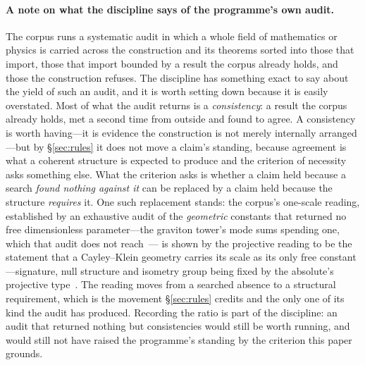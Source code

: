 \documentclass[11pt,a4paper]{article}
\begin{document}
\paragraph{A note on what the discipline says of the programme's own audit.} The corpus runs a
systematic audit in which a whole field of mathematics or physics is carried across
the construction and its theorems sorted into those that import, those that import bounded by a
result the corpus already holds, and those the construction refuses. The discipline has something
exact to say about the yield of such an audit, and it is worth setting down because it is easily
overstated. Most of what the audit returns is a \emph{consistency}: a result the corpus already
holds, met a second time from outside and found to agree. A consistency is worth having---it is
evidence the construction is not merely internally arranged---but by \S\ref{sec:rules} it does not
move a claim's standing, because agreement is what a coherent structure is expected to produce and
the criterion of necessity asks something else. What the criterion asks is whether a claim held
because a search \emph{found nothing against it} can be replaced by a claim held because the
structure \emph{requires} it. One such replacement stands: the corpus's one-scale reading,
established by an exhaustive audit of the \emph{geometric} constants that returned no free dimensionless
parameter---the graviton tower's mode sums spending one, which that audit does not
reach~\cite{JanzenCanonicalTime}---
is shown by the projective reading to be the statement that a Cayley--Klein geometry carries its
scale as its only free constant---signature, null structure and isometry group being fixed by the
absolute's projective type~\cite{JanzenGeometricCore}. The reading moves from a searched absence to
a structural requirement, which is the movement \S\ref{sec:rules} credits and the only one of its
kind the audit has produced. Recording the ratio is part of the discipline: an audit that
returned nothing but consistencies would still be worth running, and would still not have raised the
programme's standing by the criterion this paper grounds.
\end{document}
